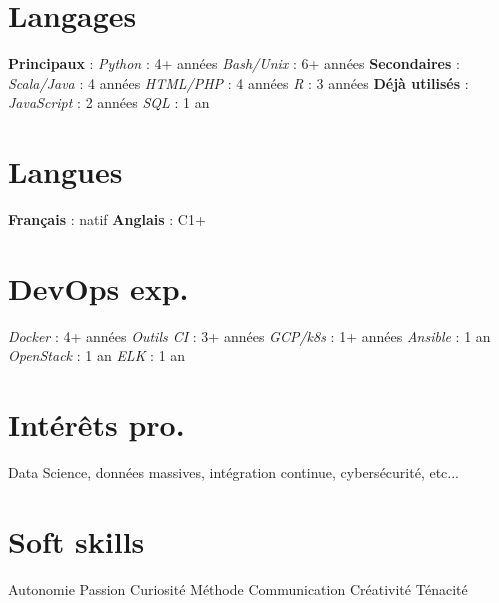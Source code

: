 \documentclass[]{friggeri-cv}
\begin{document}
\begin{aside}
  \section{Langages}
  \textbf{Principaux} :
  \emph{Python} : 4+ années
  \emph{Bash/Unix} : 6+ années
  \textbf{Secondaires} :
  \emph{Scala/Java} : 4 années
  \emph{HTML/PHP} : 4 années
  \emph{R} : 3 années
  \textbf{Déjà utilisés} :
  \emph{JavaScript} : 2 années
  \emph{SQL }: 1 an
  ~
  \section{Langues}
  \textbf{Français} : natif
  \textbf{Anglais} : C1+
  ~
  \section{DevOps exp.}
  \emph{Docker} : 4+ années
  \emph{Outils CI} : 3+ années
  \emph{GCP/k8s} : 1+ années
  \emph{Ansible} : 1 an
  \emph{OpenStack} : 1 an
  \emph{ELK} : 1 an
    ~
  \section{Intérêts pro.}
  Data Science, 
  données massives, 
  intégration continue,
  cybersécurité, etc...
  ~
  \section{Soft skills}
  Autonomie
  Passion
  Curiosité
  Méthode
  Communication 
  Créativité
  Ténacité
    ~
\end{aside}
\end{document}
